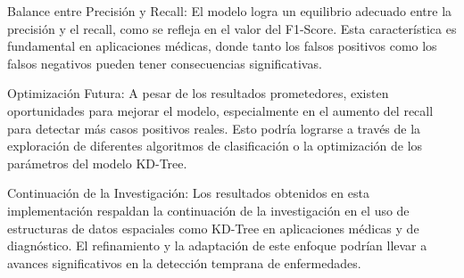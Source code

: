 \documentclass[]{article}
\begin{document}
Balance entre Precisión y Recall: El modelo logra un equilibrio adecuado entre la precisión y el recall, como se refleja en el valor del F1-Score. Esta característica es fundamental en aplicaciones médicas, donde tanto los falsos positivos como los falsos negativos pueden tener consecuencias significativas.

Optimización Futura: A pesar de los resultados prometedores, existen oportunidades para mejorar el modelo, especialmente en el aumento del recall para detectar más casos positivos reales. Esto podría lograrse a través de la exploración de diferentes algoritmos de clasificación o la optimización de los parámetros del modelo KD-Tree.

Continuación de la Investigación: Los resultados obtenidos en esta implementación respaldan la continuación de la investigación en el uso de estructuras de datos espaciales como KD-Tree en aplicaciones médicas y de diagnóstico. El refinamiento y la adaptación de este enfoque podrían llevar a avances significativos en la detección temprana de enfermedades.
\end{document}
